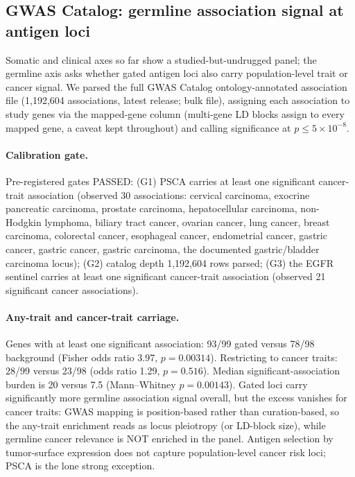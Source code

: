\subsection{GWAS Catalog: germline association signal at antigen loci}
\label{sec:gwas}
Somatic and clinical axes so far show a studied-but-undrugged panel; the
germline axis asks whether gated antigen loci also carry population-level
trait or cancer signal. We parsed the full GWAS Catalog ontology-annotated
association file (1,192,604 associations, latest release; bulk file), assigning
each association to study genes via the mapped-gene column (multi-gene LD
blocks assign to every mapped gene, a caveat kept throughout) and calling
significance at $p\le5\times10^{-8}$.

\paragraph{Calibration gate.} Pre-registered gates PASSED: (G1) PSCA carries
at least one significant cancer-trait association (observed 30 associations: cervical carcinoma, exocrine pancreatic carcinoma, prostate carcinoma, hepatocellular carcinoma, non-Hodgkin lymphoma, biliary tract cancer, ovarian cancer, lung cancer, breast carcinoma, colorectal cancer, esophageal cancer, endometrial cancer, gastric cancer, gastric cancer, gastric carcinoma, the
documented gastric/bladder carcinoma locus); (G2) catalog depth 1,192,604 rows
parsed; (G3) the EGFR sentinel carries at least one significant
cancer-trait association (observed 21 significant cancer associations).

\paragraph{Any-trait and cancer-trait carriage.} Genes with at least one
significant association: 93/99 gated versus 78/98 background
(Fisher odds ratio 3.97, $p=0.00314$). Restricting to cancer traits:
28/99 versus 23/98 (odds ratio 1.29, $p=0.516$). Median
significant-association burden is 20 versus 7.5 (Mann--Whitney
$p=0.00143$). Gated loci carry significantly more germline association signal overall, but the excess vanishes for cancer traits: GWAS mapping is position-based rather than curation-based, so the any-trait enrichment reads as locus pleiotropy (or LD-block size), while germline cancer relevance is NOT enriched in the panel. Antigen selection by tumor-surface expression does not capture population-level cancer risk loci; PSCA is the lone strong exception.

